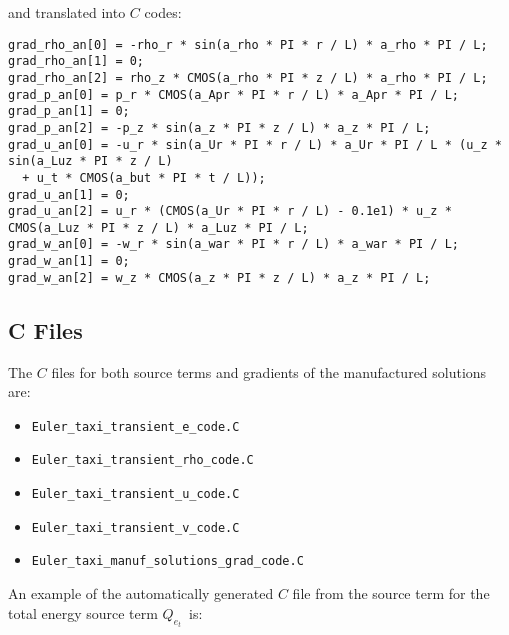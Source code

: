 \documentclass[10pt]{article}
\begin{document}
 and translated into $C$ codes:
\begin{small}
 \begin{verbatim}
grad_rho_an[0] = -rho_r * sin(a_rho * PI * r / L) * a_rho * PI / L;
grad_rho_an[1] = 0;
grad_rho_an[2] = rho_z * CMOS(a_rho * PI * z / L) * a_rho * PI / L;
grad_p_an[0] = p_r * CMOS(a_Apr * PI * r / L) * a_Apr * PI / L;
grad_p_an[1] = 0;
grad_p_an[2] = -p_z * sin(a_z * PI * z / L) * a_z * PI / L;
grad_u_an[0] = -u_r * sin(a_Ur * PI * r / L) * a_Ur * PI / L * (u_z * sin(a_Luz * PI * z / L)
  + u_t * CMOS(a_but * PI * t / L));
grad_u_an[1] = 0;
grad_u_an[2] = u_r * (CMOS(a_Ur * PI * r / L) - 0.1e1) * u_z * CMOS(a_Luz * PI * z / L) * a_Luz * PI / L;
grad_w_an[0] = -w_r * sin(a_war * PI * r / L) * a_war * PI / L;
grad_w_an[1] = 0;
grad_w_an[2] = w_z * CMOS(a_z * PI * z / L) * a_z * PI / L;
\end{verbatim}
\end{small}



\subsection{C Files}
The $C$ files for both source terms and gradients of the  manufactured solutions are:
\begin{itemize}
\item \texttt{Euler\_taxi\_transient\_e\_code.C}
 \item \texttt{Euler\_taxi\_transient\_rho\_code.C}
 \item \texttt{Euler\_taxi\_transient\_u\_code.C}
 \item \texttt{Euler\_taxi\_transient\_v\_code.C}
 \item \texttt{Euler\_taxi\_manuf\_solutions\_grad\_code.C}
\end{itemize}

An example of the automatically generated $C$ file from the source term for the total energy source term $Q_{e_t}$~is:
\end{document}
